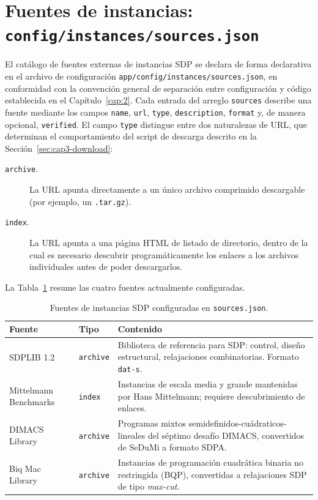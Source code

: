 \section{Fuentes de instancias: \texttt{config/instances/sources.json}}
\label{sec:cap3-sources}

El cat\'alogo de fuentes externas de instancias SDP se declara de forma
declarativa en el archivo de configuraci\'on
\texttt{app/config/instances/sources.json}, en conformidad con la
convenci\'on general de separaci\'on entre configuraci\'on y c\'odigo
establecida en el Cap\'itulo~\ref{cap:2}. Cada entrada del arreglo
\texttt{sources} describe una fuente mediante los campos \texttt{name},
\texttt{url}, \texttt{type}, \texttt{description}, \texttt{format} y, de
manera opcional, \texttt{verified}. El campo \texttt{type} distingue entre
dos naturalezas de URL, que determinan el comportamiento del script de
descarga descrito en la Secci\'on~\ref{sec:cap3-download}:

\begin{description}
    \item[\texttt{\textquotedbl archive\textquotedbl}.] La URL apunta
    directamente a un \'unico archivo comprimido descargable (por ejemplo,
    un \texttt{.tar.gz}).
    \item[\texttt{\textquotedbl index\textquotedbl}.] La URL apunta a una
    p\'agina HTML de listado de
    directorio, dentro de la cual es necesario descubrir program\'aticamente
    los enlaces a los archivos individuales antes de poder descargarlos.
\end{description}

La Tabla~\ref{tab:cap3-fuentes} resume las cuatro fuentes actualmente
configuradas.

\begin{table}[htbp]
\centering
\caption{Fuentes de instancias SDP configuradas en \texttt{sources.json}.}
\label{tab:cap3-fuentes}
\begin{tabular}{p{2.6cm}p{2cm}p{7.5cm}}
\toprule
\textbf{Fuente} & \textbf{Tipo} & \textbf{Contenido} \\
\midrule
SDPLIB 1.2 & \texttt{archive} & Biblioteca de referencia para SDP: control,
dise\~no estructural, relajaciones combinatorias. Formato \texttt{dat-s}. \\
Mittelmann Benchmarks & \texttt{index} & Instancias de escala media y
grande mantenidas por Hans Mittelmann; requiere descubrimiento de enlaces. \\
DIMACS Library & \texttt{archive} & Programas mixtos
semidefinidos-cu\'adraticos-lineales del s\'eptimo desaf\'io DIMACS,
convertidos de SeDuMi a formato SDPA. \\
Biq Mac Library & \texttt{archive} & Instancias de programaci\'on
cuadr\'atica binaria no restringida (BQP), convertidas a relajaciones SDP de
tipo \emph{max-cut}. \\
\bottomrule
\end{tabular}
\end{table}

